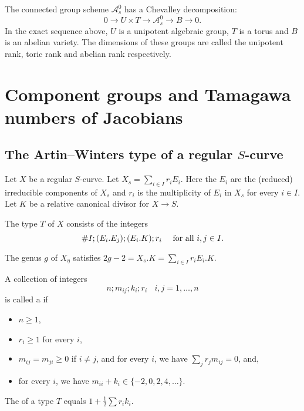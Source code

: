 The connected group scheme $\mathcal{A}_s^0$ has a Chevalley decomposition:
\[ 0 \rightarrow U \times T \rightarrow \mathcal{A}_s^0 \rightarrow B \rightarrow 0. \]
In the exact sequence above, $U$ is a unipotent algebraic group, $T$ is a torus and $B$ is an abelian variety. The dimensions of these groups are called the unipotent rank, toric rank and abelian rank respectively. 

\section{Component groups and Tamagawa numbers of Jacobians}\label{defcompgrp}

\subsection{The Artin--Winters type of a regular $S$-curve}
Let $X$ be a regular $S$-curve. Let $X_s = \sum_{i \in I} r_i E_i$. Here the $E_i$ are the (reduced) irreducible components of $X_s$ and $r_i$ is the multiplicity of $E_i$ in $X_s$ for every $i \in I$. Let $K$ be a relative canonical divisor for $X \rightarrow S$.
\begin{defin}\cite[Definition~1.2]{artwin}
 The type $T$ of $X$ consists of the integers
 \[ \# I; (E_i.E_j); (E_i.K); r_i \ \ \ \ \textup{for all } i,j \in I .\]
\end{defin}

The genus $g$ of $X_\eta$ satisfies $2g-2 = X_s.K = \sum_{i \in I} r_i E_i.K$.

\begin{defin}
  A collection of integers 
  \[ n; m_{ij}; k_i; r_i \ \ \ \ i,j = 1,\ldots,n \]
  is called a {} if
  \begin{itemize}
   \item $n \geq 1$,
   \item $r_i \geq 1$ for every $i$,
   \item $m_{ij} = m_{ji} \geq 0$ if $i \neq j$, and for every $i$, we have $\sum_{j} r_j m_{ij} = 0$, and,
   \item for every $i$, we have $m_{ii} + k_i \in \{-2,0,2,4,\ldots\}$.
  \end{itemize}
\end{defin}

\begin{defin}
 The {} of a type $T$ equals $1 + \tfrac{1}{2} \sum r_i k_i$.
\end{defin}

